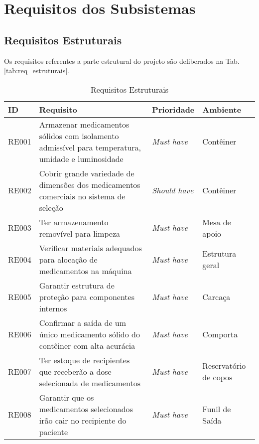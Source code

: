 \section{Requisitos dos Subsistemas}
\subsection{Requisitos Estruturais}

Os requisitos referentes a parte estrutural do projeto são deliberados na Tab. \ref{tab:req_estruturais}.

\begin{table}[H]
        \centering
    \caption{Requisitos Estruturais}
	\begin{adjustbox}{max width = \textwidth}
        \begin{tabular}{|L{1.5cm}|L{8.5cm}|C{2.5cm}|C{3.5cm}|}
            \hline
            \textbf{ID} & \textbf{Requisito} & \textbf{Prioridade} & \textbf{Ambiente} \\
            \hline
            RE001 & Armazenar medicamentos sólidos com isolamento admissível para temperatura, umidade e luminosidade & \textit{Must have} & Contêiner\\ 
            \hline
            RE002 & Cobrir grande variedade de dimensões dos medicamentos comerciais no sistema de seleção & \textit{Should have} & Contêiner \\
            \hline
            RE003 & Ter armazenamento removível para limpeza & \textit{Must have} & Mesa de apoio\\
            \hline
            RE004 & Verificar materiais adequados para alocação de medicamentos na máquina & \textit{Must have} & Estrutura geral\\
            \hline
            RE005 &  Garantir estrutura de proteção para componentes internos & \textit{Must have} & Carcaça\\
            \hline
            RE006 & Confirmar a saída de um único medicamento sólido do contêiner com alta acurácia & \textit{Must have}  & Comporta\\ 
            \hline
            RE007 & Ter estoque de recipientes que receberão a dose selecionada de medicamentos & \textit{Must have} & Reservatório de copos\\
            \hline
            RE008 & Garantir que os medicamentos selecionados irão cair no recipiente do paciente & \textit{Must have}  & Funil de Saída\\ 
            \hline

\end{tabular}
\end{adjustbox}
\end{table}
